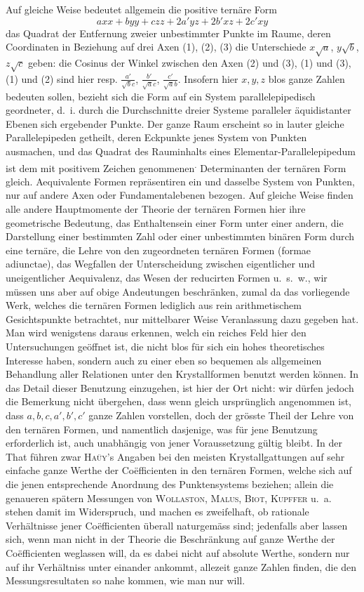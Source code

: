 Auf gleiche Weise bedeutet allgemein die positive ternäre Form
\[
axx+byy+czz+2a'yz+2b'xz+2c'xy
\]
das Quadrat der Entfernung zweier unbestimmter Punkte im Raume, deren Coordinaten in Beziehung auf drei Axen (1), (2), (3) die Unterschiede $x\surd a$, $y\surd b$, $z\surd c$
geben: die Cosinus der Winkel zwischen den Axen (2) und (3), (1) und (3), (1) und (2) sind hier resp. $\frac{a'}{\surd bc}$, $\frac{b'}{\surd ac}$, $\frac{c'}{\surd ab}$. Insofern hier $x,y,z$ blos ganze Zahlen bedeuten sollen, bezieht sich die Form auf ein System parallelepipedisch geordneter, d.~i. durch die Durchschnitte dreier Systeme paralleler äquidistanter Ebenen sich ergebender Punkte. Der ganze Raum erscheint so in lauter gleiche Parallelepipeden getheilt, deren Eckpunkte jenes System von Punkten ausmachen, und das Quadrat des Rauminhalts eines Elementar-Parallelepipedum ist dem mit positivem Zeichen genommenen\textsuperscript{.} Determinanten der ternären Form gleich. Aequivalente Formen repräsentiren ein und dasselbe System von Punkten, nur auf andere Axen oder Fundamentalebenen bezogen. Auf gleiche Weise finden alle andere Hauptmomente der Theorie der ternären Formen hier ihre geometrische Bedeutung, das Enthaltensein einer Form unter einer andern, die Darstellung einer bestimmten Zahl oder einer unbestimmten binären Form durch eine ternäre, die Lehre von den zugeordneten ternären Formen (formae adiunctae), das Wegfallen der Unterscheidung zwischen eigentlicher und uneigentlicher Aequivalenz, das Wesen der reducirten Formen u.~s.~w., wir müssen uns aber auf obige Andeutungen beschränken, zumal da das vorliegende Werk, welches die ternären Formen lediglich aus rein arithmetischem Gesichtspunkte betrachtet, nur mittelbarer Weise Veranlassung dazu gegeben hat. Man wird wenigstens daraus erkennen, welch ein reiches Feld hier den Untersuchungen geöffnet ist, die nicht blos für sich ein hohes theoretisches Interesse haben, sondern auch zu einer eben so bequemen als allgemeinen Behandlung aller Relationen unter den Krystallformen benutzt werden können. In das Detail dieser Benutzung einzugehen, ist hier der Ort nicht: wir dürfen jedoch die Bemerkung nicht übergehen, dass wenn gleich ursprünglich angenommen ist, dass $a,b,c,a',b',c'$ ganze Zahlen vorstellen, doch der grösste Theil der Lehre von den ternären Formen, und namentlich dasjenige, was für jene Benutzung erforderlich ist, auch unabhängig von jener Voraussetzung gültig bleibt. In der That führen zwar \textsc{Haüy}'s Angaben bei den meisten Krystallgattungen auf sehr einfache ganze Werthe der Coëfficienten in den ternären Formen, welche sich auf die jenen entsprechende Anordnung des Punktensystems beziehen; allein die genaueren spätern Messungen von \textsc{Wollaston}, \textsc{Malus}, \textsc{Biot}, \textsc{Kupffer} u.~a. stehen damit im Widerspruch, und machen es zweifelhaft, ob rationale Verhältnisse jener Coëfficienten überall naturgemäss sind; jedenfalls aber lassen sich, wenn man nicht in der Theorie die 
Beschränkung auf ganze Werthe der Coëfficienten weglassen will, da es dabei nicht auf absolute Werthe, sondern nur auf ihr Verhältniss unter einander ankommt, allezeit ganze Zahlen finden, die den Messungsresultaten so nahe kommen, wie man nur will.

